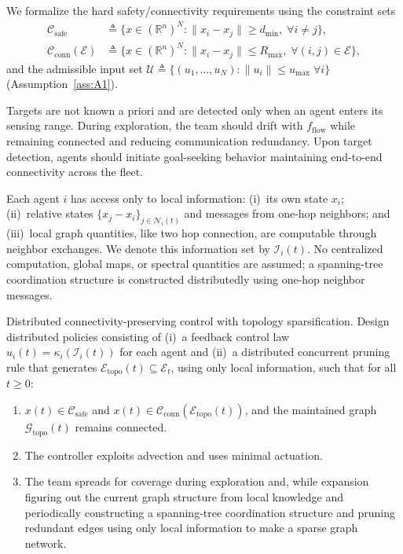 \documentclass[conference]{IEEEconf}
\theoremstyle{plain}
\begin{document}
We formalize the hard safety/connectivity requirements using the constraint sets
\begin{align*}
\mathcal{C}_{\mathrm{safe}} &\triangleq \Big\{x\in(\mathbb{R}^n)^N : \|x_i-x_j\|\ge d_{\min},\;\forall i\neq j\Big\},\\
\mathcal{C}_{\mathrm{conn}}(\mathcal{E}) &\triangleq \Big\{x\in(\mathbb{R}^n)^N : \|x_i-x_j\|\le R_{\max},\;\forall (i,j)\in\mathcal{E}\Big\},
\end{align*}
and the admissible input set $\mathcal{U}\triangleq\{(u_1,\dots,u_N):\|u_i\|\le u_{\max}\;\forall i\}$ (Assumption~\ref{ass:A1}).

Targets are not known a priori and are detected only when an agent enters its sensing range. During exploration, the team should drift with $f_{\text{flow}}$ while remaining connected and reducing communication redundancy. Upon target detection, agents should initiate goal-seeking behavior maintaining end-to-end connectivity across the fleet.

Each agent $i$ has access only to local information: (i)~its own state $x_i$; (ii)~relative states $\{x_j-x_i\}_{j\in\mathcal{N}_i(t)}$ and messages from one-hop neighbors; and (iii)~local graph quantities, like two hop connection, are computable through neighbor exchanges. We denote this information set by $\mathcal{I}_i(t)$. No centralized computation, global maps, or spectral quantities are assumed; a spanning-tree coordination structure is constructed distributedly using one-hop neighbor messages.

\noindent Distributed connectivity-preserving control with topology sparsification.
Design distributed policies consisting of (i)~a feedback control law $u_i(t)=\kappa_i(\mathcal{I}_i(t))$ for each agent and (ii)~a distributed concurrent pruning rule that generates $\mathcal{E}_{\mathrm{topo}}(t)\subseteq\mathcal{E}_t$, using only local information, such that for all $t\ge 0$:
\begin{enumerate}
    \item  $x(t)\in\mathcal{C}_{\mathrm{safe}}$ and $x(t)\in\mathcal{C}_{\mathrm{conn}}(\mathcal{E}_{\mathrm{topo}}(t))$, and the maintained graph $\mathcal{G}_{\mathrm{topo}}(t)$ remains connected.
    \item The controller exploits advection and uses minimal actuation.
    \item The team spreads for coverage during exploration and, while expansion figuring out the current graph structure from local knowledge and periodically constructing a spanning-tree coordination structure and pruning redundant edges using only local information to make a sparse  graph network. 
\end{enumerate}
\end{document}
